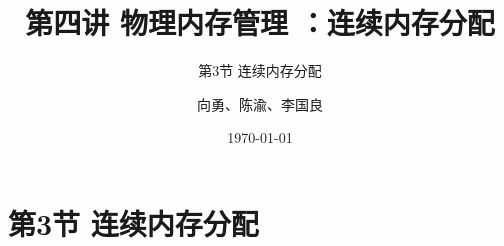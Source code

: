 


\title[第4讲]{第四讲 物理内存管理 ：连续内存分配} %
\subtitle{第3节 连续内存分配}
\author{向勇、陈渝、李国良} %
\date{\today} %



\begin{frame}
\titlepage %
\end{frame}


\section{第3节 连续内存分配}%
